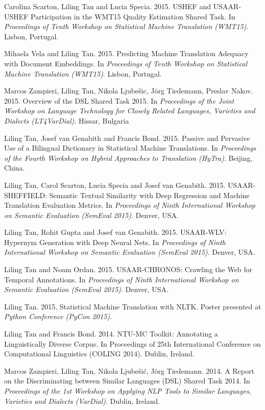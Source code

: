 {Carolina Scarton, Liling Tan and Lucia Specia. 2015. USHEF and USAAR-USHEF Participation in the WMT15 Quality Estimation Shared Task. In \textit{Proceedings of Tenth Workshop on Statistical Machine Translation (WMT15)}. Lisbon, Portugal.  

Mihaela Vela and Liling Tan. 2015. Predicting Machine Translation Adequacy with Document Embeddings. In \textit{Proceedings of Tenth Workshop on Statistical Machine Translation (WMT15)}. Lisbon, Portugal.  

Marcos Zampieri, Liling Tan, Nikola Ljubešic, Jörg Tiedemann, Preslav Nakov. 2015. Overview of the DSL Shared Task 2015. In \textit{Proceedings of the Joint Workshop on Language Technology for Closely Related Languages, Varieties and Dialects (LT4VarDial)}. Hissar, Bulgaria  

Liling Tan, Josef van Genabith and Francis Bond. 2015. Passive and Pervasive Use of a Bilingual Dictionary in Statistical Machine Translations. In \textit{Proceedings of the Fourth Workshop on Hybrid Approaches to Translation (HyTra)}. Beijing, China. 

Liling Tan, Carol Scarton, Lucia Specia and Josef van Genabith. 2015. USAAR-SHEFFIELD: Semantic Textual Similarity with Deep Regression and Machine Translation Evaluation Metrics. In \textit{Proceedings of Ninth International Workshop on Semantic Evaluation (SemEval 2015)}. Denver, USA.  

Liling Tan, Rohit Gupta and Josef van Genabith. 2015. USAAR-WLV: Hypernym Generation with Deep Neural Nets. In \textit{Proceedings of Ninth International Workshop on Semantic Evaluation (SemEval 2015)}. Denver, USA.  

Liling Tan and Noam Ordan. 2015. USAAR-CHRONOS: Crawling the Web for Temporal Annotations. In \textit{Proceedings of Ninth International Workshop on Semantic Evaluation (SemEval 2015)}. Denver, USA.  

Liling Tan. 2015. Statistical Machine Translation with NLTK. Poster presented at \textit{Python Conference (PyCon 2015)}.

Liling Tan and Francis Bond. 2014. NTU-MC Toolkit: Annotating a Linguistically Diverse Corpus. In Proceedings of 25th International Conference on Computational Linguistics (COLING 2014). Dublin, Ireland.  

Marcos Zampieri, Liling Tan, Nikola Ljubešić, Jörg Tiedemann. 2014. A Report on the Discriminating between Similar Languages (DSL) Shared Task 2014. In \textit{Proceedings of the 1st Workshop on Applying NLP Tools to Similar Languages, Varieties and Dialects (VarDial)}. Dublin, Ireland.  

}
